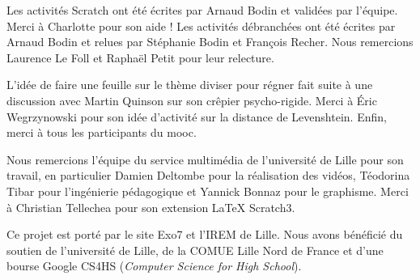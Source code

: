 Les activités Scratch ont été écrites par Arnaud Bodin et validées par l'équipe. 
Merci à Charlotte pour son aide ! 
Les activités débranchées ont été écrites par Arnaud Bodin et relues par Stéphanie Bodin et François Recher. Nous remercions Laurence Le Foll et Raphaël Petit pour leur relecture.

\medskip 

L'idée de faire une feuille sur le thème \og{}diviser pour régner\fg{} fait suite à une discussion avec Martin Quinson sur son \og{}crêpier psycho-rigide\fg{}.
Merci à Éric Wegrzynowski pour son idée d'activité sur la distance de Levenshtein. Enfin, merci à tous les participants du mooc. 

\medskip 

Nous remercions l'équipe du service multimédia de l'université de Lille pour son travail, en particulier Damien Deltombe pour la réalisation des vidéos, Téodorina Tibar pour l'ingénierie pédagogique et Yannick Bonnaz pour le graphisme. Merci à Christian Tellechea pour son extension LaTeX \og{}Scratch3\fg{}.


\medskip 

Ce projet est porté par le site Exo7 et l'IREM de Lille. 
Nous avons bénéficié du soutien de l'université de Lille, de la COMUE Lille Nord de France et d'une bourse Google CS4HS (\emph{Computer Science for High School}).

\medskip 

